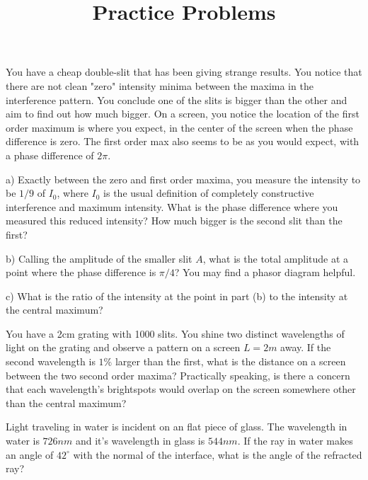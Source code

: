 \documentclass[10pt]{article}
\newenvironment{problem}[2][Problem]{\begin{trivlist}
\item[\hskip \labelsep {\bfseries #1}\hskip \labelsep {\bfseries #2.}]}{\end{trivlist}}
\begin{document}
 \title{Practice Problems }
\date{}
\maketitle

\begin{problem}{1}
You have a cheap double-slit that has been giving strange results. You notice that there are not clean "zero" intensity minima between the maxima in the interference pattern. You conclude one of the slits is bigger than the other and aim to find out how much bigger. On a screen, you notice the location of the first order maximum is where you expect, in the center of the screen when the phase difference is zero. The first order max also seems to be as you would expect, with a phase difference of $2\pi$.
\item a) Exactly between the zero and first order maxima, you measure the intensity to be $1/9$ of $I_0$, where $I_0$ is the usual definition of completely constructive interference and maximum intensity. What is the phase difference where you measured this reduced intensity? How much bigger is the second slit than the first?

\item b) Calling the amplitude of the smaller slit $A$, what is the total amplitude at a point where the phase difference is $\pi/4$? You may find a phasor diagram helpful.

\item c) What is the ratio of the intensity at the point in part (b) to the intensity at the central maximum? 
    
\end{problem}

\begin{problem}{2}
You have a 2cm grating with 1000 slits. You shine two distinct wavelengths of light on the grating and observe a pattern on a screen $L=2m$ away. If the second wavelength is $1\%$ larger than the first, what is the distance on a screen between the two second order maxima? Practically speaking, is there a concern that each wavelength's brightspots would overlap on the screen somewhere other than the central maximum?
\end{problem}

\begin{problem}{3}
Light traveling in water is incident on an flat piece of glass. The wavelength in water is $726nm$ and it's wavelength in glass is $544nm$. If the ray in water makes an angle of $42^\circ$ with the normal of the interface, what is the angle of the refracted ray?
\end{problem}
\end{document}
